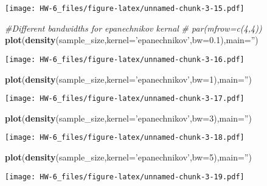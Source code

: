 \documentclass[]{article}
\newenvironment{Shaded}{\begin{snugshade}}{\end{snugshade}}
\newcommand{\CommentTok}[1]{\textcolor[rgb]{0.56,0.35,0.01}{\textit{#1}}}
\newcommand{\DataTypeTok}[1]{\textcolor[rgb]{0.13,0.29,0.53}{#1}}
\newcommand{\DecValTok}[1]{\textcolor[rgb]{0.00,0.00,0.81}{#1}}
\newcommand{\FloatTok}[1]{\textcolor[rgb]{0.00,0.00,0.81}{#1}}
\newcommand{\KeywordTok}[1]{\textcolor[rgb]{0.13,0.29,0.53}{\textbf{#1}}}
\newcommand{\NormalTok}[1]{#1}
\newcommand{\StringTok}[1]{\textcolor[rgb]{0.31,0.60,0.02}{#1}}
\begin{document}
\texttt{[image: HW-6\_files/figure-latex/unnamed-chunk-3-15.pdf]}

\begin{Shaded}
\begin{Highlighting}[]
\CommentTok{#Different bandwidths for epanechnikov kernal}
\CommentTok{# par(mfrow=c(4,4))}
\KeywordTok{plot}\NormalTok{(}\KeywordTok{density}\NormalTok{(sample_size,}\DataTypeTok{kernel=}\StringTok{'epanechnikov'}\NormalTok{,}\DataTypeTok{bw=}\FloatTok{0.1}\NormalTok{),}\DataTypeTok{main=}\StringTok{''}\NormalTok{)}
\end{Highlighting}
\end{Shaded}

\texttt{[image: HW-6\_files/figure-latex/unnamed-chunk-3-16.pdf]}

\begin{Shaded}
\begin{Highlighting}[]
\KeywordTok{plot}\NormalTok{(}\KeywordTok{density}\NormalTok{(sample_size,}\DataTypeTok{kernel=}\StringTok{'epanechnikov'}\NormalTok{,}\DataTypeTok{bw=}\DecValTok{1}\NormalTok{),}\DataTypeTok{main=}\StringTok{''}\NormalTok{)}
\end{Highlighting}
\end{Shaded}

\texttt{[image: HW-6\_files/figure-latex/unnamed-chunk-3-17.pdf]}

\begin{Shaded}
\begin{Highlighting}[]
\KeywordTok{plot}\NormalTok{(}\KeywordTok{density}\NormalTok{(sample_size,}\DataTypeTok{kernel=}\StringTok{'epanechnikov'}\NormalTok{,}\DataTypeTok{bw=}\DecValTok{3}\NormalTok{),}\DataTypeTok{main=}\StringTok{''}\NormalTok{)}
\end{Highlighting}
\end{Shaded}

\texttt{[image: HW-6\_files/figure-latex/unnamed-chunk-3-18.pdf]}

\begin{Shaded}
\begin{Highlighting}[]
\KeywordTok{plot}\NormalTok{(}\KeywordTok{density}\NormalTok{(sample_size,}\DataTypeTok{kernel=}\StringTok{'epanechnikov'}\NormalTok{,}\DataTypeTok{bw=}\DecValTok{5}\NormalTok{),}\DataTypeTok{main=}\StringTok{''}\NormalTok{)}
\end{Highlighting}
\end{Shaded}

\texttt{[image: HW-6\_files/figure-latex/unnamed-chunk-3-19.pdf]}
\end{document}
